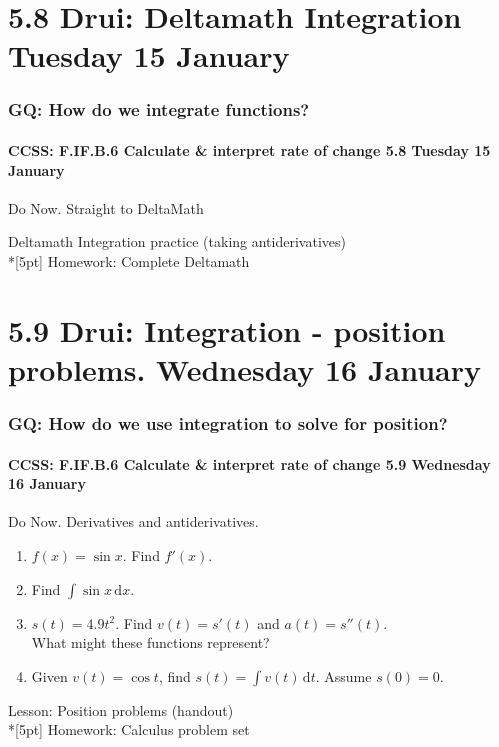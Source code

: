 \documentclass{beamer}
\begin{document}
\section{5.8 Drui: Deltamath Integration Tuesday 15 January}
  \frame
  {
  \frametitle{GQ: How do we integrate functions?}
  \framesubtitle{CCSS: F.IF.B.6 Calculate \& interpret rate of change \hfill \alert{5.8  Tuesday 15 January}}

  \begin{block}{Do Now. Straight to DeltaMath}

  \end{block}
  Deltamath Integration practice (taking antiderivatives)\\*[5pt]
  Homework: Complete Deltamath
}

\section{5.9 Drui: Integration - position problems. Wednesday 16 January}
  \frame
  {
  \frametitle{GQ: How do we use integration to solve for position?}
  \framesubtitle{CCSS: F.IF.B.6 Calculate \& interpret rate of change \hfill \alert{5.9 Wednesday 16 January}}

  \begin{block}{Do Now. Derivatives and antiderivatives.}
  \begin{enumerate}
    \item $f(x)=\sin x$. Find $f'(x)$.
    \item Find $\int \sin x \,\mathrm{d}x$.

    \item $s(t)= 4.9 t^2$. Find $v(t)=s'(t)$ and $a(t)=s''(t)$.\\
    What might these functions represent?

    \item Given $v(t)=\cos t$, find $s(t)=\int v(t) \,\mathrm{d}t$. Assume $s(0)=0$.

  \end{enumerate}
  \end{block}
  Lesson: Position problems (handout)\\*[5pt]
  Homework: Calculus problem set
}
\end{document}
